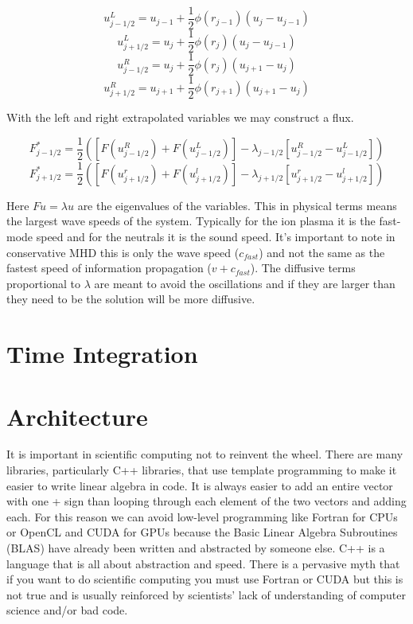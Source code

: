 \documentclass[12pt,upcase]{umlthesis}
\begin{document}
\begin{equation}
	u^L_{j-1/2} = u_{j-1} + \frac{1}{2} \phi(r_{j-1}) (u_j - u_{j-1})
\end{equation}
\begin{equation}
	u^L_{j+1/2} = u_{j} + \frac{1}{2} \phi(r_{j}) (u_j - u_{j-1})
\end{equation}
\begin{equation}
	u^R_{j-1/2} = u_{j} + \frac{1}{2} \phi(r_{j}) (u_{j+1} - u_{j})
\end{equation}
\begin{equation}
	u^R_{j+1/2} = u_{j+1} + \frac{1}{2} \phi(r_{j+1}) (u_{j+1} - u_{j})
\end{equation}

With the left and right extrapolated variables we may construct a flux.

\begin{equation}
	F^*_{j-1/2} = \frac{1}{2} ([F(u^R_{j-1/2})+F(u^L_{j-1/2})] - \lambda_{j-1/2}[u^R_{j-1/2}-u^L_{j-1/2}])
\end{equation}
\begin{equation}
	F^*_{j+1/2} = \frac{1}{2} ([F(u^r_{j+1/2})+F(u^l_{j+1/2})] - \lambda_{j+1/2}[u^r_{j+1/2}-u^l_{j+1/2}])
\end{equation}

Here $F u = \lambda u$ are the eigenvalues of the variables. This in physical terms means the largest wave speeds of the system. Typically for the ion plasma it is the fast-mode speed and for the neutrals it is the sound speed. It's important to note in conservative MHD this is only the wave speed ($c_{fast}$) and not the same as the fastest speed of information propagation ($v+c_{fast}$). The diffusive terms proportional to $\lambda$ are meant to avoid the oscillations and if they are larger than they need to be the solution will be more diffusive.

\section{Time Integration}\label{sec:timeintegration}

\section{Architecture}\label{sec:architecture}

It is important in scientific computing not to reinvent the wheel. There are many libraries, particularly C++ libraries, that use template programming to make it easier to write linear algebra in code. It is always easier to add an entire vector with one + sign than looping through each element of the two vectors and adding each. For this reason we can avoid low-level programming like Fortran for CPUs or OpenCL and CUDA for GPUs because the Basic Linear Algebra Subroutines (BLAS) have already been written and abstracted by someone else. C++ is a language that is all about abstraction and speed. There is a pervasive myth that if you want to do scientific computing you must use Fortran or CUDA but this is not true and is usually reinforced by scientists' lack of understanding of computer science and/or bad code.
\end{document}
